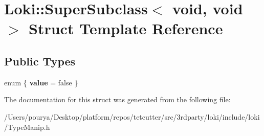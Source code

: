 \hypertarget{structLoki_1_1SuperSubclass_3_01void_00_01void_01_4}{}\section{Loki\+:\+:Super\+Subclass$<$ void, void $>$ Struct Template Reference}
\label{structLoki_1_1SuperSubclass_3_01void_00_01void_01_4}
\subsection*{Public Types}
\begin{DoxyCompactItemize}
\item 
\hypertarget{structLoki_1_1SuperSubclass_3_01void_00_01void_01_4_a6d1b7f0b94c128930b69443f93fd74ab}{}enum \{ {\bfseries value} = false
 \}\label{structLoki_1_1SuperSubclass_3_01void_00_01void_01_4_a6d1b7f0b94c128930b69443f93fd74ab}

\end{DoxyCompactItemize}


The documentation for this struct was generated from the following file\+:\begin{DoxyCompactItemize}
\item 
/\+Users/pourya/\+Desktop/platform/repos/tetcutter/src/3rdparty/loki/include/loki/Type\+Manip.\+h\end{DoxyCompactItemize}
